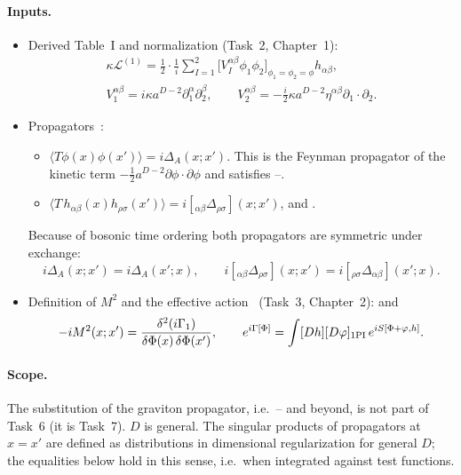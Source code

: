 \paragraph{Inputs.}
\begin{itemize}[leftmargin=30pt,labelsep=5pt]
\item[(G1)] Derived Table~I and normalization \tD{} (Task~2, Chapter~1):
\begin{equation}
\begin{gathered}
\kappa\mathcal L^{(1)}=\frac12\cdot\frac1i\sum_{I=1}^2\Big[V_I^{\alpha\beta}\phi_1\phi_2\Big]_{\phi_1=\phi_2=\phi}h_{\alpha\beta},\\
V_1^{\alpha\beta}=i\kappa a^{D-2}\partial_1^\alpha\partial_2^\beta,\qquad V_2^{\alpha\beta}=-\tfrac i2\kappa a^{D-2}\eta^{\alpha\beta}\partial_1\!\cdot\partial_2 .
\end{gathered}
\label{eq:ch3-G1}
\end{equation}
\item[(G2)] Propagators \tP\,\tA:
\begin{itemize}
\item $\langle T\phi(x)\phi(x')\rangle=i\Delta_A(x;x')$. This is the Feynman propagator of the kinetic term $-\tfrac12a^{D-2}\partial\phi\cdot\partial\phi$
and satisfies --.
\item $\langle T\,h_{\alpha\beta}(x)h_{\rho\sigma}(x')\rangle=i[{}_{\alpha\beta}\Delta_{\rho\sigma}](x;x')$, \PI{}  and .
\end{itemize}
Because of bosonic time ordering both propagators are symmetric under exchange:
\begin{equation*}
i\Delta_A(x;x')=i\Delta_A(x';x),\qquad i[{}_{\alpha\beta}\Delta_{\rho\sigma}](x;x')=i[{}_{\rho\sigma}\Delta_{\alpha\beta}](x';x).
\end{equation*}
\item[(G3)] Definition of $M^2$ and the effective action \tP\,\tA{} (Task~3, Chapter~2): \PI{}  and
\begin{equation*}
-iM^2(x;x')=\frac{\delta^2(i\Gamma_1)}{\delta\Phi(x)\,\delta\Phi(x')},\qquad e^{i\Gamma[\Phi]}=\int[Dh][D\varphi]_{\rm 1PI}\,e^{iS[\Phi+\varphi,h]}.
\end{equation*}
\end{itemize}

\paragraph{Scope.}
The substitution of the graviton propagator, i.e.\ -- and beyond, is not part of Task~6 (it is Task~7). $D$ is general.
The singular products of propagators at $x=x'$ are defined as distributions in dimensional regularization for general $D$;
the equalities below hold in this sense, i.e.\ when integrated against test functions.

